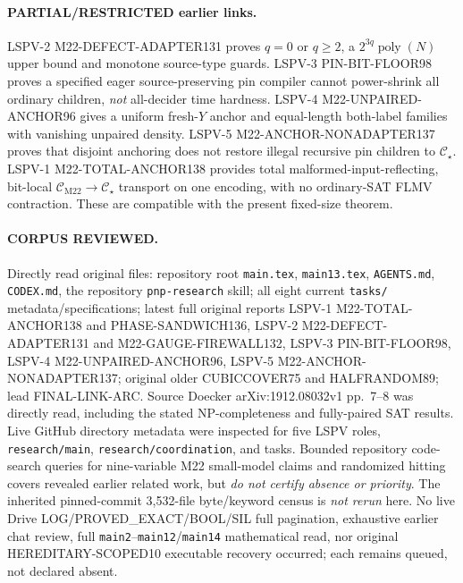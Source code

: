 \documentclass[11pt]{article}
\newcommand{\CM}{\mathcal C_{\mathrm{M22}}}
\newcommand{\CS}{\mathcal C_{\star}}
\begin{document}
\paragraph{PARTIAL/RESTRICTED earlier links.}
LSPV-2 M22-DEFECT-ADAPTER131 proves \(q=0\) or \(q\ge2\), a \(2^{3q}\operatorname{poly}(N)\) upper bound and monotone source-type guards. LSPV-3 PIN-BIT-FLOOR98 proves a specified eager source-preserving pin compiler cannot power-shrink all ordinary children, \emph{not} all-decider time hardness. LSPV-4 M22-UNPAIRED-ANCHOR96 gives a uniform fresh-\(Y\) anchor and equal-length both-label families with vanishing unpaired density. LSPV-5 M22-ANCHOR-NONADAPTER137 proves that disjoint anchoring does not restore illegal recursive pin children to \(\CS\). LSPV-1 M22-TOTAL-ANCHOR138 provides total malformed-input-reflecting, bit-local \(\CM\to\CS\) transport on one encoding, with no ordinary-SAT FLMV contraction. These are compatible with the present fixed-size theorem.

\paragraph{CORPUS REVIEWED.}
Directly read original files: repository root \texttt{main.tex}, \texttt{main13.tex}, \texttt{AGENTS.md}, \texttt{CODEX.md}, the repository \texttt{pnp-research} skill; all eight current \texttt{tasks/} metadata/specifications; latest full original reports LSPV-1 M22-TOTAL-ANCHOR138 and PHASE-SANDWICH136, LSPV-2 M22-DEFECT-ADAPTER131 and M22-GAUGE-FIREWALL132, LSPV-3 PIN-BIT-FLOOR98, LSPV-4 M22-UNPAIRED-ANCHOR96, LSPV-5 M22-ANCHOR-NONADAPTER137; original older CUBICCOVER75 and HALFRANDOM89; lead FINAL-LINK-ARC. Source Doecker arXiv:1912.08032v1 pp.\ 7--8 was directly read, including the stated NP-completeness and fully-paired SAT results. Live GitHub directory metadata were inspected for five LSPV roles, \texttt{research/main}, \texttt{research/coordination}, and tasks. Bounded repository code-search queries for nine-variable M22 small-model claims and randomized hitting covers revealed earlier related work, but \emph{do not certify absence or priority}. The inherited pinned-commit 3,532-file byte/keyword census is \emph{not rerun} here. No live Drive LOG/PROVED\_EXACT/BOOL/SIL full pagination, exhaustive earlier chat review, full \texttt{main2}--\texttt{main12}/\texttt{main14} mathematical read, nor original HEREDITARY-SCOPED10 executable recovery occurred; each remains queued, not declared absent.
\end{document}
